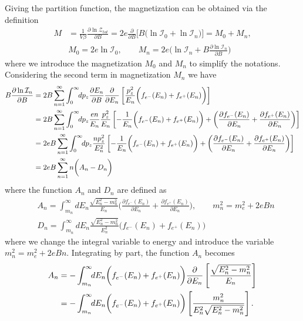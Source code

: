 \documentclass[sn-mathphys,Numbered]{sn-jnl}
\theoremstyle{thmstyleone}%
\theoremstyle{thmstyletwo}%
\theoremstyle{thmstylethree}%
\begin{document}
Giving the partition function, the magnetization can be obtained via the definition
\begin{align}
M&=\frac{1}{V\beta}\frac{\partial \ln \mathcal{Z}_{tot}}{\partial B}=2e\frac{\partial}{\partial B}\bigg[B\bigg(\ln\mathcal{I}_{0}+\ln\mathcal{I}_{n}\bigg)\bigg]=M_0+M_n,\\
&M_0=2e\ln\mathcal{I}_{0},\qquad
M_n=2e\bigg(\ln\mathcal{I}_{n}+B\frac{\partial\ln\mathcal{I}_n}{\partial B}\bigg)
\end{align}
where we introduce the magnetization $M_0$ and $M_n$ to simplify the notations. Considering the second term in magnetization $M_n$ we have
\begin{align}
B\frac{\partial\ln\mathcal{I}_n}{\partial B}&=2B \sum_{n=1}^\infty\int_0^\infty\!\!dp_z \frac{\partial E_n}{\partial B}\frac{\partial}{\partial E_n}\left[\frac{p_z^2}{E_{n}}\bigg(f_{e^-}(E_n)+f_{e^+}(E_n)\bigg)\right]\notag\\
&=2B \sum_{n=1}^\infty\int_0^\infty\!\!dp_z \frac{en}{E_n}\frac{p_z^2}{E_{n}}\left[-\frac{1}{E_{n}}\bigg(f_{e^-}(E_n)+f_{e^+}(E_n)\bigg)+\bigg(\frac{\partial f_{e^-}(E_n)}{\partial E_n}+\frac{\partial f_{e^+}(E_n)}{\partial E_n}\bigg)\right]\notag\\
&=2eB \sum_{n=1}^\infty\int_0^\infty\!\!dp_z \frac{n p_z^2}{E^2_{n}}\left[-\frac{1}{E_{n}}\bigg(f_{e^-}(E_n)+f_{e^+}(E_n)\bigg)+\bigg(\frac{\partial f_{e^-}(E_n)}{\partial E_n}+\frac{\partial f_{e^+}(E_n)}{\partial E_n}\bigg)\right]\notag\\
&=2eB\sum_{n=1}^\infty n\bigg(A_n-D_n\bigg)
\end{align}
where the function $A_n$ and $D_n$ are defined as
\begin{align}
 \label{Function_A}
    &A_n=\int_{m_n}^\infty\!\!dE_n \frac{\sqrt{E^2_n-m^2_n}}{E_{n}}\bigg(\frac{\partial f_{e^-}(E_n)}{\partial E_n}+\frac{\partial f_{e^+}(E_n)}{\partial E_n}\bigg),\qquad m_n^2=m^2_e+2eBn\\ 
    \label{Function_D}
    &D_n=\int_{m_n}^\infty\!\!dE_n \frac{\sqrt{E^2_n-m^2_n}}{E^2_{n}}\bigg(f_{e^-}(E_n)+f_{e^+}(E_n)\bigg)
\end{align}
where we change the integral variable to energy and introduce the variable $m_n^2=m^2_e+2eBn$. Integrating by part, the function $A_n$ becomes
\begin{align}
A_n&=-\int_{m_n}^\infty\!\!dE_n \bigg(f_{e^-}(E_n)+f_{e^+}(E_n)\bigg)\frac{\partial}{\partial E_n}\left[\frac{\sqrt{E^2_n-m^2_n}}{E_{n}}\right]\notag\\
&=-\int_{m_n}^\infty\!\!dE_n \bigg(f_{e^-}(E_n)+f_{e^+}(E_n)\bigg)\left[\frac{m^2_n}{E^2_{n}\sqrt{E^2_n-m^2_n}}\right].
\end{align}
\end{document}
